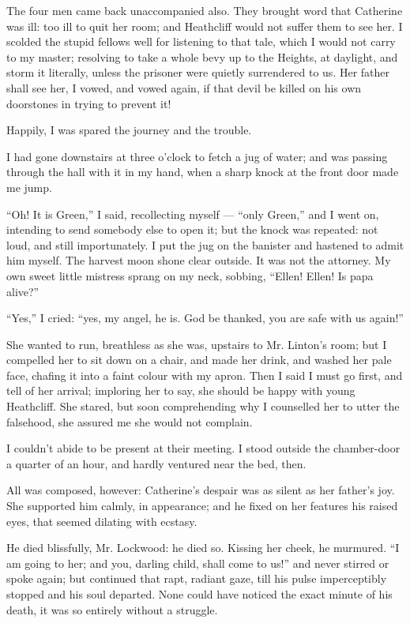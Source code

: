 \par The four men came back unaccompanied also. They brought word that Catherine was ill: too ill to quit her room; and Heathcliff would not suffer them to see her. I scolded the stupid fellows well for listening to that tale, which I would not carry to my master; resolving to take a whole bevy up to the Heights, at daylight, and storm it literally, unless the prisoner were quietly surrendered to us. Her father shall see her, I vowed, and vowed again, if that devil be killed on his own doorstones in trying to prevent it!
\par Happily, I was spared the journey and the trouble.
\par I had gone downstairs at three o'clock to fetch a jug of water; and was passing through the hall with it in my hand, when a sharp knock at the front door made me jump.
\par “Oh! It is Green,” I said, recollecting myself — “only Green,” and I went on, intending to send somebody else to open it; but the knock was repeated: not loud, and still importunately. I put the jug on the banister and hastened to admit him myself. The harvest moon shone clear outside. It was not the attorney. My own sweet little mistress sprang on my neck, sobbing, “Ellen! Ellen! Is papa alive?”
\par “Yes,” I cried: “yes, my angel, he is. God be thanked, you are safe with us again!”
\par She wanted to run, breathless as she was, upstairs to Mr. Linton's room; but I compelled her to sit down on a chair, and made her drink, and washed her pale face, chafing it into a faint colour with my apron. Then I said I must go first, and tell of her arrival; imploring her to say, she should be happy with young Heathcliff. She stared, but soon comprehending why I counselled her to utter the falsehood, she assured me she would not complain.
\par I couldn't abide to be present at their meeting. I stood outside the chamber-door a quarter of an hour, and hardly ventured near the bed, then.
\par All was composed, however: Catherine's despair was as silent as her father's joy. She supported him calmly, in appearance; and he fixed on her features his raised eyes, that seemed dilating with ecstasy.
\par He died blissfully, Mr. Lockwood: he died so. Kissing her cheek, he murmured. “I am going to her; and you, darling child, shall come to us!” and never stirred or spoke again; but continued that rapt, radiant gaze, till his pulse imperceptibly stopped and his soul departed. None could have noticed the exact minute of his death, it was so entirely without a struggle.
